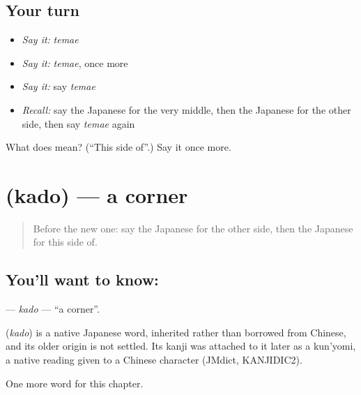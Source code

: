 \subsection*{Your turn}
\begin{itemize}
\raggedright
  \item \emph{Say it:} \emph{temae}
  \item \emph{Say it:} \emph{temae}, once more
  \item \emph{Say it:} say \emph{temae}
  \item \emph{Recall:} say the Japanese for the very middle, then the Japanese for the other side, then say \emph{temae} again
\end{itemize}

\begin{tcolorbox}[breakable,colback=teal!4,colframe=teal!35!black,title={Before you move on}]
What does  mean? (\textquotedblleft{}This side of\textquotedblright{}.) Say it once more.
\end{tcolorbox}
\section[\texorpdfstring{\ja{かど} (kado)}{かど (kado)}]{ (kado) — a corner}

\label{lesson:JA-C79-kado}



\begin{quote}
Before the new one: say the Japanese for the other side, then the Japanese for this side of.
\end{quote}

\subsection*{You'll want to know: }
\textbf{} — \emph{kado} — \textquotedblleft{}a corner\textquotedblright{}.

\begin{cousinweb}
\textbf{} (\emph{kado}) is a native Japanese word, inherited rather than borrowed from Chinese, and its older origin is not settled. Its kanji was attached to it later as a kun'yomi, a native reading given to a Chinese character (JMdict, KANJIDIC2).
\end{cousinweb}

\begin{grammarlens}[title={What you've built}]
One more word for this chapter.
\end{grammarlens}

